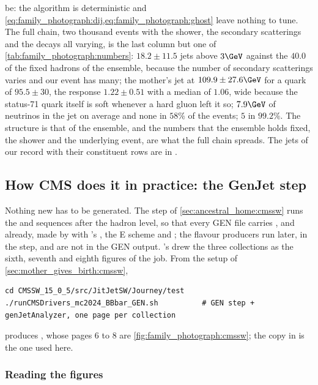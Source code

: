 be: the algorithm is deterministic and
\cref{eq:family_photograph:dij,eq:family_photograph:ghost} leave nothing
to tune. The full chain, two thousand events with the shower, the
secondary scatterings and the decays all varying, is the last column but
one of \cref{tab:family_photograph:numbers}: $18.2\pm11.5$ \akfour jets
above $3\GeV$ against the $40.0$ of the fixed hadrons of the ensemble,
because the number of secondary scatterings varies and our event has
many; the mother's jet at $109.9\pm27.6\GeV$ for a quark of $95.5\pm30$,
the response $1.22\pm0.51$ with a median of $1.06$, wide because the
status-71 quark itself is soft whenever a hard gluon left it so; $7.9\GeV$
of neutrinos in the jet on average and none in $58\%$ of the events;
\hadflav $5$ in $99.2\%$. The structure is that of the ensemble, and the
numbers that the ensemble holds fixed, the shower and the underlying
event, are what the full chain spreads. The \FASTJET jets of our record
with their constituent rows are in
.

\subsection{How CMS does it in practice: the GenJet step}
\label{sec:family_photograph:cmssw}

Nothing new has to be generated. The  step of
\cref{sec:ancestral_home:cmssw} runs the  and
 sequences after the hadron level, so that every GEN
file carries \akfour, \akfournonu and \akeight already, made by
 with \FASTJET's \antikt, the E scheme and
; the flavour producers run later, in the
 step, and are not in the GEN output. 's
 drew the three collections as the sixth, seventh
and eighth figures of the job. From the setup of
\cref{sec:mother_gives_birth:cmssw},
\begin{verbatim}
cd CMSSW_15_0_5/src/JitJetSW/Journey/test
./runCMSDrivers_mc2024_BBbar_GEN.sh          # GEN step + genJetAnalyzer, one page per collection
\end{verbatim}
produces , whose
pages 6 to 8 are \cref{fig:family_photograph:cmssw}; the copy in
 is the one used here.

\subsubsection{Reading the figures}

